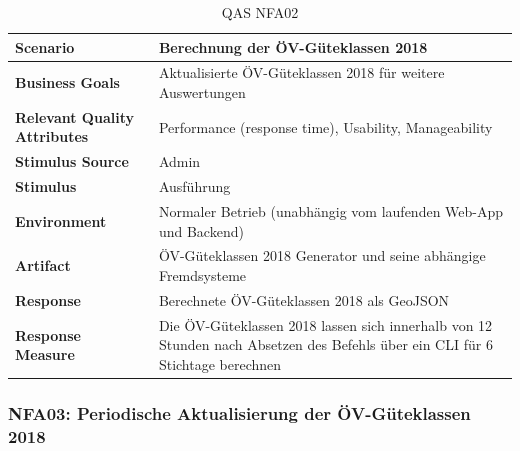 \begin{table}[H]
    \begin{tabular}{l p{10.6cm}}
        \toprule
        \textbf{Scenario}
                                & Berechnung der ÖV-Güteklassen 2018\\
        \midrule
        \textbf{Business Goals}
                                & Aktualisierte ÖV-Güteklassen 2018 für weitere Auswertungen\\
        \textbf{Relevant Quality Attributes}
                                & Performance (response time), Usability, Manageability\\
        \textbf{Stimulus Source}
                                & Admin\\
        \textbf{Stimulus}
                                & Ausführung \nameref{Use Cases:UC01}\\
        \textbf{Environment}
                                & Normaler Betrieb (unabhängig vom laufenden Web-App und Backend)\\
        \textbf{Artifact}
                                & ÖV-Güteklassen 2018 Generator und seine abhängige Fremdsysteme\\
        \textbf{Response}
                                & Berechnete ÖV-Güteklassen 2018 als GeoJSON\\  
        \textbf{Response Measure}
                                & Die ÖV-Güteklassen 2018 lassen sich innerhalb von 12 Stunden nach Absetzen des Befehls über ein CLI für 6 Stichtage berechnen\\                                
        \bottomrule
    \end{tabular}
    \caption{QAS NFA02}
    \label{table:nfa02}
\end{table}

\subsubsection{NFA03: Periodische Aktualisierung der ÖV-Güteklassen 2018}
\label{NFA:NFA03}

